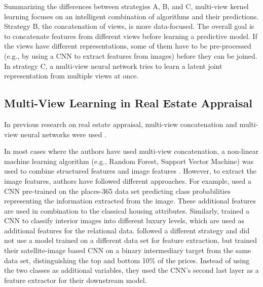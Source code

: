 \documentclass[letterpaper]{article}
\begin{document}
Summarizing the differences between strategies A, B, and C, multi-view kernel learning focuses on an intelligent combination of algorithms and their predictions. Strategy B, the concatenation of views, is more data-focused. The overall goal is to concatenate features from different views before learning a predictive model. If the views have different representations, some of them have to be pre-processed (e.g., by using a CNN to extract features from images) before they can be joined. In strategy C, a multi-view neural network tries to learn a latent joint representation from multiple views at once.


\subsection{Multi-View Learning in Real Estate Appraisal}
In previous research on real estate appraisal, multi-view concatenation and multi-view neural networks were used \cite{liu2018learning, law2019take, bency2017beyond}.

In most cases where the authors have used multi-view concatenation, a non-linear machine learning algorithm (e.g., Random Forest, Support Vector Machine) was used to combine structured features and image features \cite{bency2017beyond, poursaeed2018vision, bessinger2016quantifying}. However, to extract the image features, authors have followed different approaches. For example, \citeauthor{bessinger2016quantifying} \citeyearpar{bessinger2016quantifying} used a CNN pre-trained on the places-365 data set predicting class probabilities representing the information extracted from the image. These additional features are used in combination to the classical housing attributes. Similarly, \citeauthor{poursaeed2018vision} \citeyearpar{poursaeed2018vision} trained a CNN to classify interior images into different luxury levels, which are used as additional features for the relational data. \citeauthor{bency2017beyond} \citeyearpar{bency2017beyond} followed a different strategy and did not use a model trained on a different data set for feature extraction, but trained their satellite-image based CNN on a binary intermediary target from the same data set, distinguishing the top and bottom 10\% of the prices. Instead of using the two classes as additional variables, they used the CNN's second last layer as a feature extractor for their downstream model.
\end{document}
